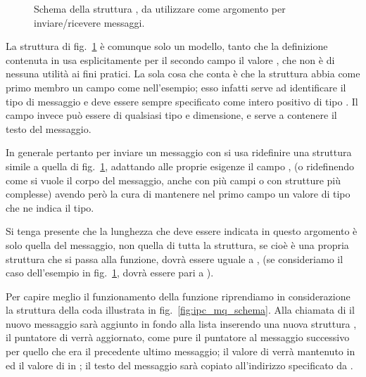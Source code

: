 \begin{figure}[!htb]
  \footnotesize \centering
  \begin{minipage}[c]{0.8\textwidth}
  \end{minipage} 
  \normalsize 
  \caption{Schema della struttura , da utilizzare come
    argomento per inviare/ricevere messaggi.}
  \label{fig:ipc_msbuf}
\end{figure}

La struttura di fig.~\ref{fig:ipc_msbuf} è comunque solo un modello, tanto che
la definizione contenuta in  usa esplicitamente per il
secondo campo il valore , che non è di nessuna utilità ai fini
pratici.  La sola cosa che conta è che la struttura abbia come primo membro un
campo  come nell'esempio; esso infatti serve ad identificare il
tipo di messaggio e deve essere sempre specificato come intero positivo di
tipo .  Il campo  invece può essere di qualsiasi tipo e
dimensione, e serve a contenere il testo del messaggio.

In generale pertanto per inviare un messaggio con  si usa
ridefinire una struttura simile a quella di fig.~\ref{fig:ipc_msbuf}, adattando
alle proprie esigenze il campo , (o ridefinendo come si vuole il
corpo del messaggio, anche con più campi o con strutture più complesse) avendo
però la cura di mantenere nel primo campo un valore di tipo  che ne
indica il tipo.

Si tenga presente che la lunghezza che deve essere indicata in questo
argomento è solo quella del messaggio, non quella di tutta la struttura, se
cioè  è una propria struttura che si passa alla funzione,
 dovrà essere uguale a , (se
consideriamo il caso dell'esempio in fig.~\ref{fig:ipc_msbuf}, 
dovrà essere pari a ).

Per capire meglio il funzionamento della funzione riprendiamo in
considerazione la struttura della coda illustrata in
fig.~\ref{fig:ipc_mq_schema}. Alla chiamata di  il nuovo
messaggio sarà aggiunto in fondo alla lista inserendo una nuova struttura
, il puntatore  di  verrà
aggiornato, come pure il puntatore al messaggio successivo per quello che era
il precedente ultimo messaggio; il valore di  verrà mantenuto in
 ed il valore di  in ; il testo del
messaggio sarà copiato all'indirizzo specificato da .

